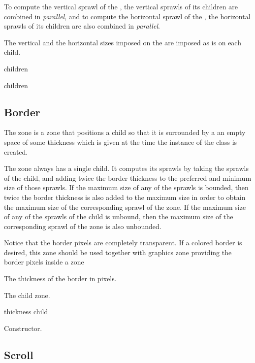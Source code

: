 To compute the vertical sprawl of the , the vertical
sprawls of its children are combined in \emph{parallel}, and to
compute the horizontal sprawl of the , the horizontal
sprawls of its children are also combined in \emph{parallel}. 


The vertical and the horizontal sizes imposed on the 
are imposed as is on each child.


 {children}

 {\rest children}

\subsection{Border}
\label{sec-zones-layout-border}

The  zone is a zone that positions a child so that it is
surrounded by a an empty space of some thickness which is given at the
time the instance of the  class is created.

The  zone always has a single child.  It computes its
sprawls by taking the sprawls of the child, and adding twice the border
thickness to the preferred and minimum size of those sprawls.  If the
maximum size of any of the sprawls is bounded, then twice the border
thickness is also added to the maximum size in order to obtain the
maximum size of the corresponding sprawl of the  zone.
If the maximum size of any of the sprawls of the child is unbound,
then the maximum size of the corresponding sprawl of the 
zone is also unbounded.

Notice that the border pixels are completely transparent.  If a
colored border is desired, this zone should be used together with
graphics zone providing the border pixels inside a  zone



The thickness of the border in pixels.  


The child zone.

 {thickness child}

Constructor.

\subsection{Scroll}

